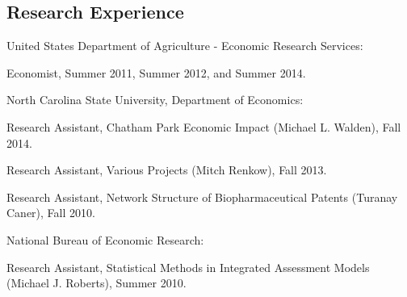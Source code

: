 \documentclass[letterpaper]{article}
\renewenvironment{itemize}{
  \begin{list}{}{
    \setlength{\leftmargin}{1.5em}
  }
}{
  \end{list}
}
\begin{document}
\subsection*{Research Experience}
\begin{itemize}
\item United States Department of Agriculture - Economic Research Services:
\begin{itemize}
\item Economist, Summer 2011, Summer 2012, and Summer 2014.
\end{itemize}

\item North Carolina State University, Department of Economics:
\begin{itemize}
\item Research Assistant, Chatham Park Economic Impact (Michael L. Walden), Fall 2014.
\item Research Assistant, Various Projects (Mitch Renkow), Fall 2013.
\item Research Assistant, Network Structure of Biopharmaceutical Patents (Turanay Caner), Fall 2010.
\end{itemize}

\item National Bureau of Economic Research:
\begin{itemize}
\item Research Assistant, Statistical Methods in Integrated Assessment Models (Michael J. Roberts), Summer 2010.
\end{itemize}
\end{itemize}

% 
\end{document}
